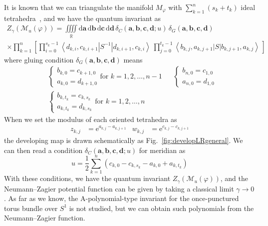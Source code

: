 \documentclass[12pt,reqno]{amsart}
\newcommand{\middle}{{}}
\numberwithin{equation}{section}
\newcommand{\E}{\mathrm{e}}
\begin{document}
It is known that we can triangulate the manifold $M_\varphi$ with
$\sum_{k=1}^n (s_k+t_k)$ ideal tetrahedra~\cite{FloyHatc82a}, and we have the
quantum invariant as
\begin{multline}
  \label{Z_punctured_torus}
  Z_\gamma\left( \mathcal{M}_u(\varphi) \right)
  =
  \iiiint\limits_{\mathbb{R}}
  \mathrm{d} \boldsymbol{a} \,
  \mathrm{d} \boldsymbol{b} \,
  \mathrm{d} \boldsymbol{c} \,
  \mathrm{d} \boldsymbol{d} \,
  \delta_C(\boldsymbol{a}, \boldsymbol{b} ,
  \boldsymbol{c}, \boldsymbol{d}; u) \,
  \delta_G(\boldsymbol{a}, \boldsymbol{b} ,
  \boldsymbol{c}, \boldsymbol{d})
  \\
  \times
  \prod_{k=1}^n
  \left[
    \prod_{i=0}^{s_{k} -1}
    \left\langle d_{k,i} , c_{k, i+1} \middle| S^{-1} \middle|
      d_{k,i+1}, c_{k,i} \right\rangle \,
    \prod_{j=0}^{t_{k} -1}
    \left\langle b_{k,j} , a_{k,j+1} \middle| S \middle|
      b_{k,j+1}, a_{k,j} \right\rangle \,
  \right]
\end{multline}
where gluing condition $
  \delta_G(\boldsymbol{a}, \boldsymbol{b} ,
  \boldsymbol{c}, \boldsymbol{d})
$ means
\begin{align*}
  &
  \begin{cases}
    b_{k,0} = c_{k+1,0} 
    \\
    a_{k,0} = d_{k+1,0}
  \end{cases}
  \text{for $k=1,2, \dots,n-1$}
  & &
  \begin{cases}
    b_{n,0} = c_{1,0}
    \\
    a_{n,0} = d_{1,0}
  \end{cases}
  \\[2mm]
  & \begin{cases}
    b_{k,t_k} = c_{k, s_k}
    \\
    a_{k,t_k} = d_{k, s_k}
  \end{cases}
  \text{for $k=1,2,\dots, n$}
  & 
\end{align*}
When we set the modulus of each oriented tetrahedra as
\begin{align*}
  z_{k,j}
  & =
  \E^{a_{k,j} - a_{k,j+1}}
  &
  w_{k,j}
  & =
  \E^{c_{k,j} - c_{k,j+1}}
\end{align*}
the developing map is drawn schematically
as Fig.~\ref{fig:developLRgeneral}.
We can then read
a condition
$  \delta_C(\boldsymbol{a}, \boldsymbol{b} ,
  \boldsymbol{c}, \boldsymbol{d}; u)
$ for meridian  as
\begin{equation}
  u=
  \frac{1}{2} 
  \sum_{k=1}^n
  \left(
    c_{k,0} - c_{k,s_{k}} - a_{k,0} + a_{k,t_{k}}
  \right)
\end{equation}
With these conditions, we have the quantum invariant
$Z_\gamma \left( \mathcal{M}_u(\varphi) \right)$, and the
Neumann--Zagier potential function
can be given by taking a classical limit $\gamma\to 0$.
As far as we know,
the A-polynomial-type invariant for the once-punctured torus bundle over
$S^1$ is not studied, but we can  obtain
such polynomials from the
Neumann--Zagier function.
\end{document}
